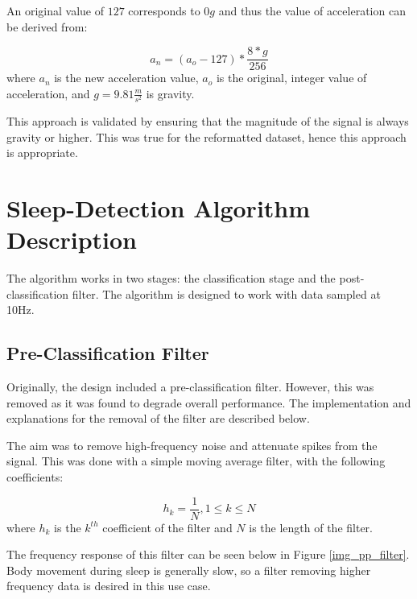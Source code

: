             An original value of $127$ corresponds to $0g$ and thus the value of acceleration can be derived from:

            \begin{equation}
                a_n = (a_o - 127)*\frac{8*g}{256}
            \end{equation}
            where $a_n$ is the new acceleration value, $a_o$ is the original, integer value of acceleration, and $g=9.81\frac{m}{s^2}$ is gravity.

            This approach is validated by ensuring that the magnitude of the signal is always gravity or higher. This was true for the reformatted dataset, hence this approach is appropriate.



    \chapter{Sleep-Detection Algorithm Description}

        The algorithm works in two stages: the classification stage and the post-classification filter. The algorithm is designed to work with data sampled at 10Hz. 

        \section{Pre-Classification Filter}

            Originally, the design included a pre-classification filter. However, this was removed as it was found to degrade overall performance. The implementation and explanations for the removal of the filter are described below.

            The aim was to remove high-frequency noise and attenuate spikes from the signal. This was done with a simple moving average filter, with the following coefficients:

            \begin{equation}
                h_k = \frac{1}{N}, 1\leq k\leq N
            \end{equation}
            where $h_k$ is the $k^{th}$ coefficient of the filter and $N$ is the length of the filter.

            The frequency response of this filter can be seen below in Figure \ref{img_pp_filter}. Body movement during sleep is generally slow, so a filter removing higher frequency data is desired in this use case.


